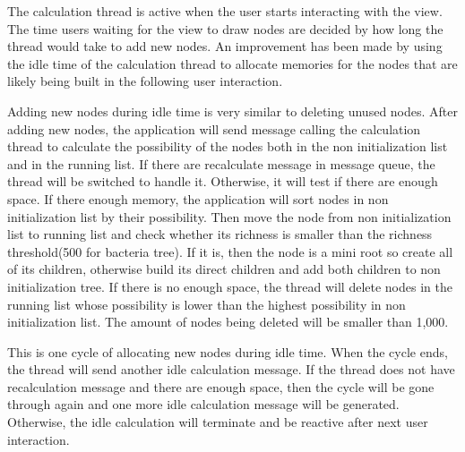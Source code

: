 \documentclass[MSc]{icldt}
\begin{document}
The calculation thread is active when the user starts interacting with the view. The time users waiting for the view to draw nodes are decided by how long the thread would take to add new nodes. An improvement has been made by using the idle time of the calculation thread to allocate memories for the nodes that are likely being built in the following user interaction. 

Adding new nodes during idle time is very similar to deleting unused nodes. After adding new nodes, the application will send message calling the calculation thread to calculate the possibility of the nodes both in the non initialization list and in the running list. If there are recalculate message in message queue, the thread will be switched to handle it. Otherwise, it will test if there are enough space. If there enough memory, the application will sort nodes in non initialization list by their possibility. Then move the node from non initialization list to running list and check whether its richness is smaller than the richness threshold(500 for bacteria tree). If it is, then the node is a mini root so create all of its children, otherwise build its direct children and add both children to non initialization tree. If there is no enough space, the thread will delete nodes in the running list whose possibility is lower than the highest possibility in non initialization list. The amount of nodes being deleted will be smaller than 1,000.

This is one cycle of allocating new nodes during idle time. When the cycle ends, the thread will send another idle calculation message. If the thread does not have recalculation message and there are enough space, then the cycle will be gone through again and one more idle calculation message will be generated. Otherwise, the idle calculation will terminate and be reactive after next user interaction.
\end{document}
